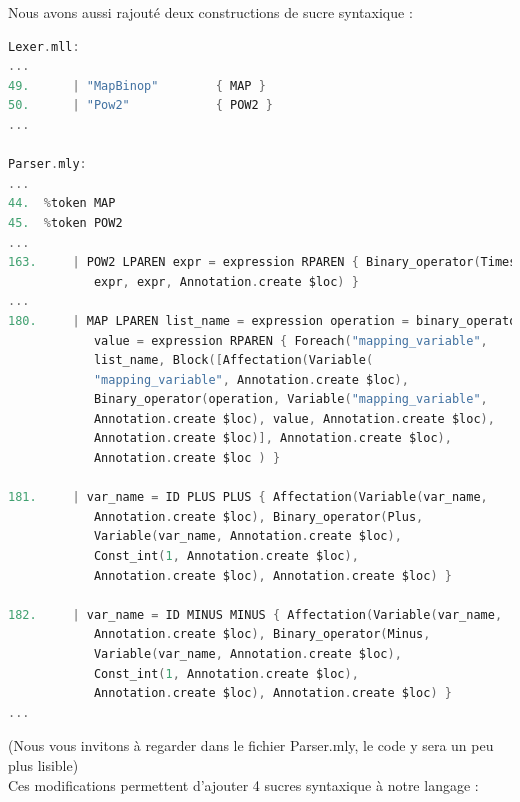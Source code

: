 \documentclass{report}
\begin{document}
    Nous avons aussi rajouté deux constructions de sucre syntaxique :\\

    \begin{lstlisting}[language=C, basicstyle=\ttfamily]
Lexer.mll:
...
49.      | "MapBinop"        { MAP } 
50.      | "Pow2"            { POW2 }
...

Parser.mly:
...
44.  %token MAP
45.  %token POW2
...
163.     | POW2 LPAREN expr = expression RPAREN { Binary_operator(Times, 
            expr, expr, Annotation.create $loc) }
...
180.     | MAP LPAREN list_name = expression operation = binary_operator 
            value = expression RPAREN { Foreach("mapping_variable", 
            list_name, Block([Affectation(Variable(
            "mapping_variable", Annotation.create $loc), 
            Binary_operator(operation, Variable("mapping_variable", 
            Annotation.create $loc), value, Annotation.create $loc),
            Annotation.create $loc)], Annotation.create $loc), 
            Annotation.create $loc ) }

181.     | var_name = ID PLUS PLUS { Affectation(Variable(var_name,
            Annotation.create $loc), Binary_operator(Plus,
            Variable(var_name, Annotation.create $loc),
            Const_int(1, Annotation.create $loc),
            Annotation.create $loc), Annotation.create $loc) }

182.     | var_name = ID MINUS MINUS { Affectation(Variable(var_name,
            Annotation.create $loc), Binary_operator(Minus, 
            Variable(var_name, Annotation.create $loc), 
            Const_int(1, Annotation.create $loc), 
            Annotation.create $loc), Annotation.create $loc) }
...
    \end{lstlisting}

    (Nous vous invitons à regarder dans le fichier Parser.mly, le code y sera un peu plus lisible)\\
    Ces modifications permettent d'ajouter 4 sucres syntaxique à notre langage :\\
\end{document}
